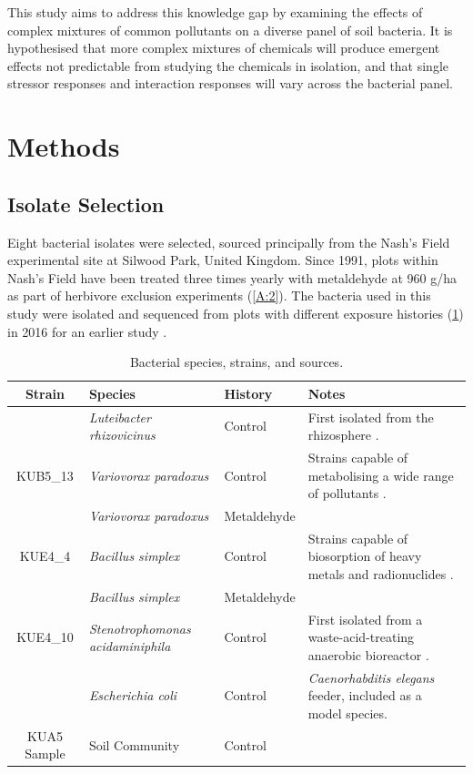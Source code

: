 \documentclass[10pt]{article}
\begin{document}
This study aims to address this knowledge gap by examining the effects of complex mixtures of common pollutants on a diverse panel of soil bacteria. It is hypothesised that more complex mixtures of chemicals will produce emergent effects not predictable from studying the chemicals in isolation, and that single stressor responses and interaction responses will vary across the bacterial panel.

\section{Methods}
\label{S:2}
\subsection{Isolate Selection}
\label{S:2:1}

Eight bacterial isolates were selected, sourced principally from the Nash's Field experimental site at Silwood Park, United Kingdom. Since 1991, plots within Nash's Field have been treated three times yearly with metaldehyde at 960 g/ha as part of herbivore exclusion experiments \cite{Allan2011ContrastingExperiment} (\cref{A:2}). The bacteria used in this study were isolated and sequenced from plots with different exposure histories (\cref{tab:isolates}) in 2016 for an earlier study \cite{Mombrikotb2016}. 

\begin{table}[ht]
\begin{small}
\centering
\begin{tabular}{c p{3.1cm} l p{5.2cm}}
\toprule 
\textbf{{Strain}} & \textbf{{Species}} & \textbf{{History}} & \textbf{{Notes}} \\
\midrule
\rowcolor{gggrey}{LUF4\_5} & \textit{Luteibacter rhizovicinus} & Control & First isolated from the rhizosphere \cite{Johansen2005LuteibacterL.}. \\
{KUB5\_13} & \textit{Variovorax paradoxus} & Control & Strains capable of metabolising a wide range of pollutants \cite{Satola2013MetabolicParadoxus}. \\
\rowcolor{gggrey}{NUF1\_3} & \textit{Variovorax paradoxus} & Metaldehyde & \\
{KUE4\_4} & \textit{Bacillus simplex} & Control & Strains capable of biosorption of heavy metals and radionuclides \cite{Valentine1996BiosorptionZone}. \\
\rowcolor{gggrey}{NUE1\_1} & \textit{Bacillus simplex} & Metaldehyde & \\
{KUE4\_10} & \textit{Stenotrophomonas \newline acidaminiphila} & Control & First isolated from a waste-acid-treating anaerobic bioreactor \cite{Assih2002}. \\
\rowcolor{gggrey}{OP50} & \textit{Escherichia coli} & Control & \textit{Caenorhabditis elegans} feeder\cite{Stiernagle2006}, included as a model species. \\
{KUA5 Sample} & Soil Community & Control & \\
\bottomrule
\end{tabular}
\caption{Bacterial species, strains, and sources.}
\label{tab:isolates}
\end{small}
\end{table}
\end{document}
